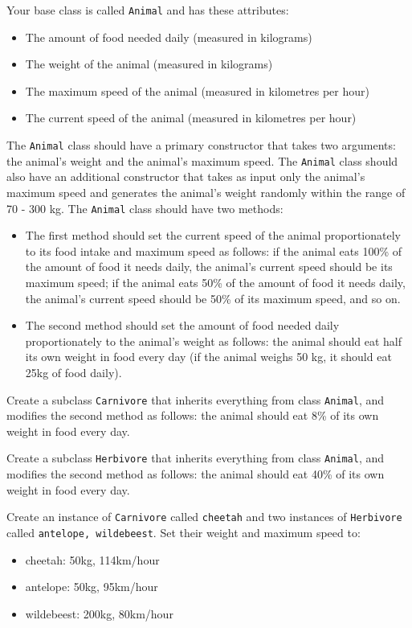 \documentclass[a4paper,12pt]{article}
\begin{document}
\begin{enumerate}[label=11ø.\arabic*,start=0]
  Your base class is called \texttt{Animal} and has these attributes: 
  \begin{itemize}
  \item The amount of food needed daily (measured in kilograms)
  \item The weight of the animal (measured in kilograms)
  \item The maximum speed of the animal (measured in kilometres per hour)
  \item The current speed of the animal (measured in kilometres per hour)
  \end{itemize}
  The \texttt{Animal} class should have a primary constructor that takes two arguments: the animal's weight and the animal's maximum speed. The \texttt{Animal} class should also have an additional constructor that takes as input only the animal's maximum speed and generates the animal's weight randomly within the range of 70 - 300 kg. The \texttt{Animal} class should have two methods:
  \begin{itemize}
  \item The first method should set the current speed of the animal proportionately to its food intake and maximum speed as follows: if the animal eats 100\% of the amount of food it needs daily, the animal's current speed should be its maximum speed; if the animal eats 50\% of the amount of food it needs daily, the animal's current speed should be 50\% of its maximum speed, and so on.
  \item The second method should set the amount of food needed daily proportionately to the animal's weight as follows: the animal should eat half its own weight in food every day (if the animal weighs 50 kg, it should eat 25kg of food daily).
  \end{itemize}
  
  
  Create a subclass \texttt{Carnivore} that inherits everything from class \texttt{Animal}, and modifies the second method as follows: the animal should eat 8\% of its own weight in food every day.
  
  Create a subclass \texttt{Herbivore} that inherits everything from class \texttt{Animal}, and modifies the second method as follows: the animal should eat 40\% of its own weight in food every day.
  
  Create an instance of \texttt{Carnivore} called \texttt{cheetah} and two instances of \texttt{Herbivore} called \texttt{antelope, wildebeest}. Set their weight and maximum speed to:
  \begin{itemize}
  \item cheetah: 50kg, 114km/hour
  \item antelope: 50kg, 95km/hour
  \item wildebeest: 200kg, 80km/hour
  \end{itemize}
  

\end{enumerate}
\end{document}
